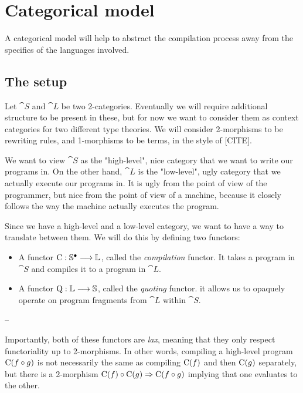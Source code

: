 \section{Categorical model}\label{sec:model}

A categorical model will help to abstract the compilation process away from the
specifics of the languages involved.

\subsection{The setup}


Let $\cat S$ and $\cat L$ be two 2-categories. Eventually we will require
additional structure to be present in these, but for now we want to consider
them as context categories for two different type theories. We will consider
2-morphisms to be rewriting rules, and 1-morphisms to be terms, in the style of
  [CITE].

We want to view $\cat S$ as the "high-level", nice category that we want to
write our programs in. On the other hand, $\cat L$ is the "low-level", ugly
category that we actually execute our programs in. It is ugly from the point of
view of the programmer, but nice from the point of view of a machine, because
it closely follows the way the machine actually executes the program.

Since we have a high-level and a low-level category, we want to have a way to
translate between them. We will do this by defining two functors:
\begin{itemize}
  \item A functor $\mathrm C : \mathbb S^{\bullet} \longrightarrow \mathbb L $, called the
        \emph{compilation} functor. It takes a program in $\cat S$ and compiles it to a
        program in $\cat L$.
  \item A functor $\mathrm Q : \mathbb L \longrightarrow \mathbb S $, called the \emph{quoting}
        functor. it allows us to opaquely operate on program fragments from $\cat L$
        within $\cat S$.
\end{itemize}

--

Importantly, both of these functors are \emph{lax}, meaning that they only
respect functoriality up to 2-morphisms. In other words, compiling a high-level
program $\mathrm C(f \circ g)$ is not necessarily the same as compiling $\mathrm
  C(f)$ and then $\mathrm C(g)$ separately, but there is a 2-morphism $\mathrm C(f)
  \circ \mathrm C(g) \Rightarrow \mathrm C(f \circ g)$ implying that one evaluates to
the other.

